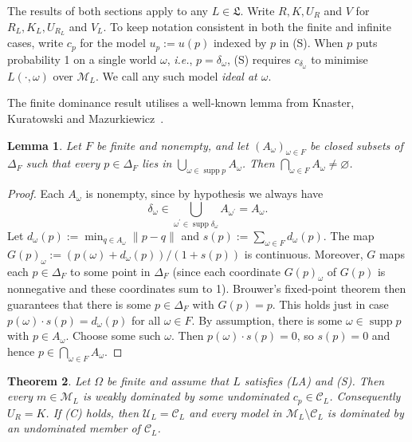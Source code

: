 \documentclass[11pt]{article}
\newtheorem{theorem}{Theorem}[section]
\newtheorem{lemma}[theorem]{Lemma}
\theoremstyle{definition}
\theoremstyle{remark}
\newcommand{\M}{\mathcal M}
\newcommand{\C}{\mathcal C}
\newcommand{\U}{\mathcal U}
\newcommand{\supp}{\operatorname{supp}}
\begin{document}
The results of both sections apply to any $L\in\mathfrak L$. Write $R,K,U_R$ and $V$ for $R_L,K_L,U_{R_L}$ and $V_L$. To keep notation consistent in both the finite and infinite cases, write $c_p$ for the model $u_p:=u(p)$ indexed by $p$ in (S). When $p$ puts probability 1 on a single world $\omega$, \textit{i.e.}, $p=\delta_\omega$, (S) requires $c_{\delta_\omega}$ to minimise $L(\cdot,\omega)$ over $\M_L$. We call any such model \emph{ideal at $\omega$}. 



The finite dominance result utilises a well-known lemma from Knaster, Kuratowski and Mazurkiewicz~\cite{KKM}.


\begin{lemma}\label{lem:kkm}
Let $F$ be finite and nonempty, and let $(A_\omega)_{\omega\in F}$ be closed subsets of $\Delta_F$ such that every $p\in\Delta_F$ lies in $\bigcup_{\omega\in\supp p}A_\omega$. Then $\bigcap_{\omega\in F}A_\omega\ne\varnothing$.
\end{lemma}
\begin{proof}
Each $A_\omega$ is nonempty, since by hypothesis we always have 
\[
\delta_\omega\in\bigcup_{\omega^\prime\in\supp \delta_\omega}A_{\omega^\prime}=A_\omega.
\]
Let $d_\omega(p):=\min_{q\in A_\omega}\lVert p-q \rVert$ and $s(p):=\sum_{\omega\in F} d_\omega(p)$. The map $G(p)_\omega:=(p(\omega)+d_\omega(p))/(1+s(p))$ is continuous. Moreover, $G$ maps each $p\in\Delta_F$ to some point in $\Delta_F$ (since each coordinate $G(p)_\omega$ of $G(p)$ is nonnegative and these coordinates sum to 1). Brouwer's fixed-point theorem then guarantees that there is some $p\in\Delta_F$ with $G(p)=p$. This holds just in case $p(\omega)\cdot s(p)=d_\omega(p)$ for all $\omega\in F$. By assumption, there is some $\omega\in\supp p$ with $p\in A_\omega$. Choose some such $\omega$. Then $p(\omega)\cdot s(p)=0$, so $s(p)=0$ and hence $p\in\bigcap_{\omega\in F}A_\omega$.
\end{proof}
\begin{theorem}\label{thm:kkm}
Let $\Omega$ be finite and assume that $L$ satisfies (LA) and (S). Then every $m\in\M_L$ is weakly dominated by some undominated $c_p\in\C_L$. Consequently $U_R=K$. If (C) holds, then $\U_L=\C_L$ and every model in $\M_L\setminus\C_L$ is dominated by an undominated member of $\C_L$. 
\end{theorem}
\end{document}
